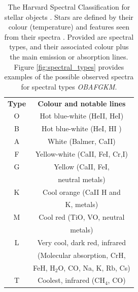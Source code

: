 \documentclass[12pt, twocolumn]{revtex4-1}    %
\begin{document}
\begin{table}
\begin{center}
\begin{tabular}{c@{\hskip 20pt}c} 
 \hline
 \textbf{Type} & \textbf{Colour and notable lines} \\ [0.5ex] 
 O & Hot blue-white (HeII, HeI) \\
 B & Hot blue-white (HeI, HI ) \\
 A & White (Balmer, CaII) \\
 F & Yellow-white (CaII, FeI, Cr,I) \\
 G & Yellow (CaII, FeI,  \\
  & neutral metals) \\
 K & Cool orange (CaII H and \\ 
  & K, metals) \\
 M & Cool red (TiO, VO, neutral \\
  & metals) \\
 L & Very cool, dark red, infrared \\
  & (Molecular absorption, CrH, \\
  & FeH, H$_2$O, CO, Na, K, Rb, Cs) \\
 T & Coolest, infrared (CH$_4$, CO) \\
 \hline
\end{tabular}
\caption{The Harvard Spectral Classification for stellar objects \citep{1916AnHar..76...19C}. Stars are defined by their colour (temperature) and features seen from their spectra \citep{stellar_colour, 1925PhDT.........1P}. Provided are spectral types, and their associated colour plus the main emission or absorption lines. Figure \ref{fig:spectral_types} provides examples of the possible observed spectra for spectral types \textit{OBAFGKM}.}
\label{table:spectral_classification}
\end{center}
\end{table}
\end{document}
